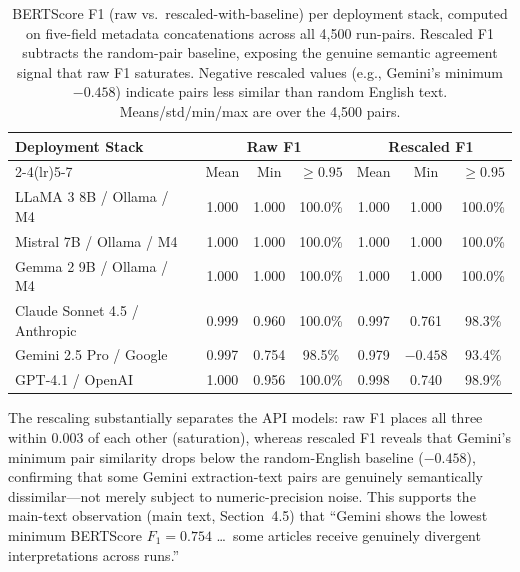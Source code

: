 \documentclass[11pt]{article}
\newenvironment{fittab}{\begin{lrbox}{\fittabbox}}{\end{lrbox}%
  \ifdim\wd\fittabbox>\linewidth\resizebox{\linewidth}{!}{\usebox{\fittabbox}}\else\usebox{\fittabbox}\fi}
\begin{document}
\begin{table}[htbp]
\centering
\caption{BERTScore F1 (raw vs.\ rescaled-with-baseline) per deployment stack, computed on five-field metadata concatenations across all 4,500 run-pairs. Rescaled F1 subtracts the random-pair baseline, exposing the genuine semantic agreement signal that raw F1 saturates. Negative rescaled values (e.g., Gemini's minimum $-0.458$) indicate pairs less similar than random English text. Means/std/min/max are over the 4,500 pairs.}
\label{tab:bertscore_rescaled}
\begin{fittab}\begin{tabular}{lcccccc}
\toprule
\textbf{Deployment Stack} & \multicolumn{3}{c}{\textbf{Raw F1}} & \multicolumn{3}{c}{\textbf{Rescaled F1}} \\
\cmidrule(lr){2-4}\cmidrule(lr){5-7}
 & Mean & Min & $\geq 0.95$ & Mean & Min & $\geq 0.95$ \\
\midrule
LLaMA 3 8B / Ollama / M4       & 1.000 & 1.000 & 100.0\% & 1.000 & 1.000 & 100.0\% \\
Mistral 7B / Ollama / M4       & 1.000 & 1.000 & 100.0\% & 1.000 & 1.000 & 100.0\% \\
Gemma 2 9B / Ollama / M4       & 1.000 & 1.000 & 100.0\% & 1.000 & 1.000 & 100.0\% \\
\midrule
Claude Sonnet 4.5 / Anthropic  & 0.999 & 0.960 & 100.0\% & 0.997 & \phantom{$-$}0.761 & 98.3\% \\
Gemini 2.5 Pro / Google        & 0.997 & 0.754 & 98.5\%  & 0.979 & $-0.458$ & 93.4\% \\
GPT-4.1 / OpenAI               & 1.000 & 0.956 & 100.0\% & 0.998 & \phantom{$-$}0.740 & 98.9\% \\
\bottomrule
\end{tabular}\end{fittab}
\end{table}

\noindent The rescaling substantially separates the API models: raw F1 places all three within 0.003 of each other (saturation), whereas rescaled F1 reveals that Gemini's minimum pair similarity drops below the random-English baseline ($-0.458$), confirming that some Gemini extraction-text pairs are genuinely semantically dissimilar---not merely subject to numeric-precision noise. This supports the main-text observation (main text, Section~4.5) that ``Gemini shows the lowest minimum BERTScore $F_1{=}0.754$ \ldots\ some articles receive genuinely divergent interpretations across runs.''

\end{document}
